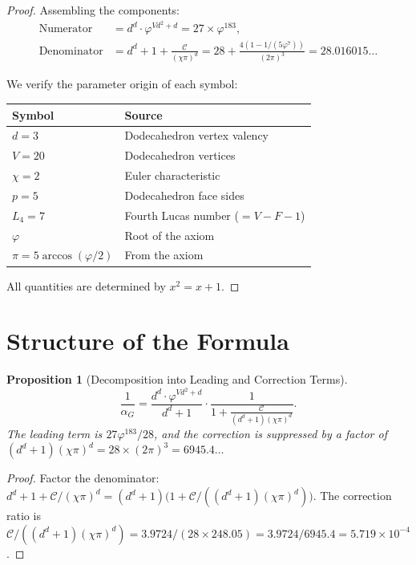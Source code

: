 \documentclass[11pt,a4paper]{article}
\theoremstyle{plain}
\newtheorem{proposition}[theorem]{Proposition}
\theoremstyle{definition}
\newcommand{\vp}{\varphi}
\begin{document}
\begin{proof}
Assembling the components:
\begin{align*}
  \text{Numerator}
  &= d^d \cdot \vp^{Vd^2+d}
   = 27 \times \vp^{183}, \\
  \text{Denominator}
  &= d^d + 1 + \frac{\mathcal{C}}{(\chi\pi)^d}
   = 28 + \frac{4(1 - 1/(5\vp^7))}{(2\pi)^3}
   = 28.016015\ldots
\end{align*}

We verify the parameter origin of each symbol:
\begin{center}
\begin{tabular}{@{}ll@{}}
\toprule
Symbol & Source \\
\midrule
$d = 3$ & Dodecahedron vertex valency \\
$V = 20$ & Dodecahedron vertices \\
$\chi = 2$ & Euler characteristic \\
$p = 5$ & Dodecahedron face sides \\
$L_4 = 7$ & Fourth Lucas number ($= V - F - 1$) \\
$\vp$ & Root of the axiom \\
$\pi = 5\arccos(\vp/2)$ & From the axiom \\
\bottomrule
\end{tabular}
\end{center}
All quantities are determined by $x^2 = x + 1$.
\end{proof}

\section{Structure of the Formula}\label{sec:structure}

\begin{proposition}[Decomposition into Leading and Correction Terms]\label{prop:decomp}
\[
  \frac{1}{\alpha_G}
  = \frac{d^d \cdot \vp^{Vd^2+d}}{d^d + 1}
    \cdot \frac{1}{1 + \frac{\mathcal{C}}{(d^d+1)(\chi\pi)^d}}.
\]
The leading term is $27\vp^{183}/28$, and the correction is suppressed
by a factor of $(d^d+1)(\chi\pi)^d = 28 \times (2\pi)^3 = 6945.4\ldots$
\end{proposition}

\begin{proof}
Factor the denominator:
$d^d + 1 + \mathcal{C}/(\chi\pi)^d
= (d^d + 1)\bigl(1 + \mathcal{C}/((d^d+1)(\chi\pi)^d)\bigr)$.
The correction ratio is $\mathcal{C}/((d^d+1)(\chi\pi)^d)
= 3.9724/(28 \times 248.05) = 3.9724/6945.4 = 5.719 \times 10^{-4}$.
\end{proof}
\end{document}
